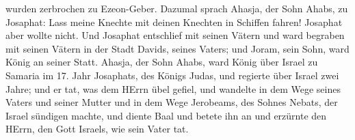 wurden zerbrochen zu Ezeon-Geber.  Dazumal sprach Ahasja,
der Sohn Ahabs, zu Josaphat: Lass meine Knechte mit deinen Knechten in
Schiffen fahren! Josaphat aber wollte nicht.  Und Josaphat
entschlief mit seinen Vätern und ward begraben mit seinen Vätern in der
Stadt Davids, seines Vaters; und Joram, sein Sohn, ward König an seiner
Statt.  Ahasja, der Sohn Ahabs, ward König über Israel zu
Samaria im 17. Jahr Josaphats, des Königs Judas, und regierte über
Israel zwei Jahre;  und er tat, was dem HErrn übel gefiel,
und wandelte in dem Wege seines Vaters und seiner Mutter und in dem Wege
Jerobeams, des Sohnes Nebats, der Israel sündigen machte, 
und diente Baal und betete ihn an und erzürnte den HErrn, den Gott
Israels, wie sein Vater tat.
